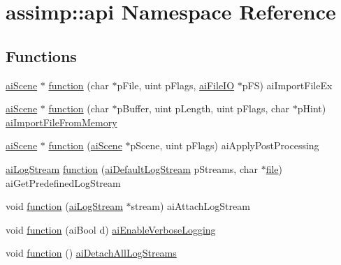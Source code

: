 \hypertarget{namespaceassimp_1_1api}{\section{assimp\+:\+:api Namespace Reference}
\label{namespaceassimp_1_1api}
}
\subsection*{Functions}
\begin{DoxyCompactItemize}
\item 
\hyperlink{structai_scene}{ai\+Scene} $\ast$ \hyperlink{namespaceassimp_1_1api_aa03d12d3d834066fbe3d3f19e92978e1}{function} (char $\ast$p\+File, uint p\+Flags, \hyperlink{structassimp_1_1file_i_o_1_1ai_file_i_o}{ai\+File\+I\+O} $\ast$p\+F\+S) ai\+Import\+File\+Ex
\item 
\hyperlink{structai_scene}{ai\+Scene} $\ast$ \hyperlink{namespaceassimp_1_1api_aabfc64e31941ad6847077eaa44d6a396}{function} (char $\ast$p\+Buffer, uint p\+Length, uint p\+Flags, char $\ast$p\+Hint) \hyperlink{_assimp_8cpp_a1b2a265a07ea1341276a8dcd7a2a3cc2}{ai\+Import\+File\+From\+Memory}
\item 
\hyperlink{structai_scene}{ai\+Scene} $\ast$ \hyperlink{namespaceassimp_1_1api_a49a7ab3400c42b9fcd6b36299dba672e}{function} (\hyperlink{structai_scene}{ai\+Scene} $\ast$p\+Scene, uint p\+Flags) ai\+Apply\+Post\+Processing
\item 
\hyperlink{structassimp_1_1types_1_1ai_log_stream}{ai\+Log\+Stream} \hyperlink{namespaceassimp_1_1api_a7e46143acbded1341d1e1f8eec2384bb}{function} (\hyperlink{namespaceassimp_1_1types_a52da3a6c31d2b1f04a0f897a22c5b3a6}{ai\+Default\+Log\+Stream} p\+Streams, char $\ast$\hyperlink{structfile}{file}) ai\+Get\+Predefined\+Log\+Stream
\item 
void \hyperlink{namespaceassimp_1_1api_ab06b574647d60f0bcc3840a3967cb841}{function} (\hyperlink{structassimp_1_1types_1_1ai_log_stream}{ai\+Log\+Stream} $\ast$stream) ai\+Attach\+Log\+Stream
\item 
void \hyperlink{namespaceassimp_1_1api_aff9b0c24a61697a57cf678f5a1d206eb}{function} (ai\+Bool d) \hyperlink{_assimp_8cpp_a54a7485c9422348b2f20adcbd192ed64}{ai\+Enable\+Verbose\+Logging}
\item 
void \hyperlink{namespaceassimp_1_1api_ae17b92a994f8dbb3b9d1ab26db7a7af4}{function} () \hyperlink{_assimp_8cpp_a8f1fe2e8ccc5f93484098114ae7071bf}{ai\+Detach\+All\+Log\+Streams}
\item 

\end{DoxyCompactItemize}
